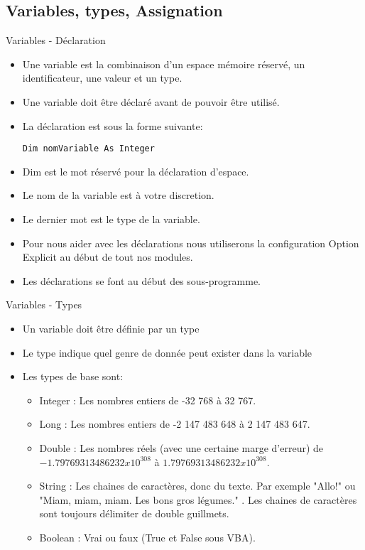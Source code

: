 \documentclass[aspectratio=169,usenames,dvipsnames]{beamer}
\begin{document}
    \subsection{Variables, types, Assignation}
    \begin{frame}[fragile]{Variables - Déclaration}
        \begin{itemize}
            \item Une variable est la combinaison d’un espace mémoire réservé, un identificateur, une valeur et un type.
            \item Une variable doit être déclaré avant de pouvoir être utilisé.
            \item La déclaration est sous la forme suivante:
            \begin{lstlisting}
Dim nomVariable As Integer
            \end{lstlisting}
            \item Dim est le mot réservé pour la déclaration d’espace.
            \item Le nom de la variable est à votre discretion.
            \item Le dernier mot est le type de la variable.
            \item Pour nous aider avec les déclarations nous utiliserons la configuration Option Explicit au début de tout nos modules.
            \item Les déclarations se font au début des sous-programme.
        \end{itemize} 
    \end{frame}
    \begin{frame}{Variables - Types}
        \begin{itemize}
            \item Un variable doit être définie par un type
            \item Le type indique quel genre de donnée peut exister dans la variable
            \item Les types de base sont:
            \begin{itemize}
                \item \alert{Integer} : Les nombres entiers de -32 768 à 32 767.
                \item \alert{Long} : Les nombres entiers de -2 147 483 648 à 2 147 483 647.
                \item \alert{Double} : Les nombres réels (avec une certaine marge d'erreur) de $-1.79769313486232 x 10^308$ à $1.79769313486232 x 10^308$.
                \item \alert{String} : Les chaines de caractères, donc du texte. Par exemple "Allo!" ou "Miam, miam, miam. Les bons gros légumes." . Les chaines de caractères sont toujours délimiter de double guillmets.
                \item \alert{Boolean} : Vrai ou faux (True et False sous VBA).
            \end{itemize}
        \end{itemize}
    \end{frame}
\end{document}
